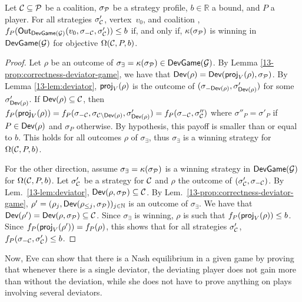 \begin{lemma} \label{13-lem:omegaCAg}
  Let \(\mathcal{C} \subseteq \mathcal{P}\) be a coalition,
  \(\sigma_{\mathcal{P}}\) be a strategy profile, \(b \in \mathbb{R}\) a bound,
  and \(P\) a player. For all strategies \(\sigma'_{\mathcal{C}}\), vertex~$v_0$,
  and coalition \Coalition, \(f_P(\textsf{Out}_{\textsf{DevGame}(\mathcal{G})}(v_0, \sigma_{-\mathcal{C}}, \sigma'_{\mathcal{C}})) \le b\) if, and
  only if, \(\kappa(\sigma_{\mathcal{P}})\) is winning in \(\textsf{DevGame}(\mathcal{G})\) for objective
  \(\Omega(\mathcal{C}, P, b)\).
\end{lemma}
\begin{proof} Let \(\rho\) be an outcome of
  \(\sigma_\exists=\kappa(\sigma_{\mathcal{P}}) \in \textsf{DevGame}(\mathcal{G})\). By Lemma
  \cref{13-prop:correctness-deviator-game}, we have that
  \(\textsf{Dev}(\rho) = \textsf{Dev}(\textsf{proj}_V(\rho),\sigma_{\mathcal{P}})\). By Lemma
  \cref{13-lem:deviator}, \(\textsf{proj}_V(\rho)\) is the outcome of
  \((\sigma_{-\textsf{Dev}(\rho)},\sigma'_{\textsf{Dev}(\rho)})\) for some
  \(\sigma'_{\textsf{Dev}(\rho)}\). If \(\textsf{Dev}(\rho) \subseteq \mathcal{C}\), then
  \(f_P(\textsf{proj}_V(\rho)) = f_P(\sigma_{-\mathcal{C}},\sigma_{\mathcal{C}\setminus \textsf{Dev}(\rho)}, \sigma'_{\textsf{Dev}(\rho)}) = f_P(\sigma_{-\mathcal{C}},\sigma''_{\mathcal{C}})\)
  where \(\sigma''_P = \sigma'_P\) if \(P \in \textsf{Dev}(\rho)\) and \(\sigma_P\)
  otherwise. By hypothesis, this payoff is smaller than or equal to \(b\).
  This holds for
  all outcomes \(\rho\) of \(\sigma_\exists\), thus \(\sigma_\exists\) is
  a winning strategy for \(\Omega(\mathcal{C},P,b)\).

  For the other direction, assume \(\sigma_\exists = \kappa(\sigma_{\mathcal{P}})\)
  is a winning strategy in \(\textsf{DevGame}(\mathcal{G})\) for \(\Omega(\mathcal{C},P,b)\). Let
  \(\sigma'_{\mathcal{C}}\) be a strategy for \(\mathcal{C}\) and \(\rho\) the outcome of
  \((\sigma'_{\mathcal{C}},\sigma_{-{\mathcal{C}}})\). By
  Lem.~\cref{13-lem:deviator},
  \(\textsf{Dev}(\rho,\sigma_{\mathcal{P}}) \subseteq \mathcal{C}\). By
  Lem.~\cref{13-prop:correctness-deviator-game},
  \(\rho'= (\rho_j, \textsf{Dev}(\rho_{\le j},\sigma_{\mathcal{P}}))_{j\in \mathbb{N}}\) is
  an outcome of \(\sigma_\exists\). We have that
  \(\textsf{Dev}(\rho') = \textsf{Dev}(\rho,\sigma_{\mathcal{P}}) \subseteq \mathcal{C}\). Since
  \(\sigma_\exists\) is winning, \(\rho\) is such that
  \(f_P(\textsf{proj}_V(\rho)) \le b\). Since
  \(f_{P}(\textsf{proj}_V(\rho')) = f_{P}(\rho)\),
  this shows that for all strategies \(\sigma'_{\mathcal{C}}\),
  \(f_P(\sigma_{-\mathcal{C}},\sigma'_{\mathcal{C}}) \le b\).
\end{proof}

Now, Eve can show that there is a Nash equilibrium in a given game
by proving that whenever there is a single deviator,
the deviating player does not gain more than without the deviation,
while she does not have to prove anything on plays involving several
deviators.

